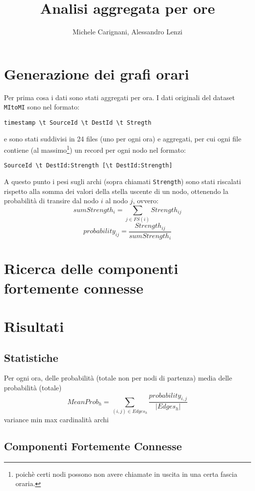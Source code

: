 \documentclass[10pt,a4paper]{article}
\author{Michele Carignani, Alessandro Lenzi}
\title{Analisi aggregata per ore}
\begin{document}
\maketitle

\section{Generazione dei grafi orari}

Per prima cosa i dati sono stati aggregati per ora. I dati originali del dataset \verb!MItoMI! sono nel formato:
\begin{verbatim}
timestamp \t SourceId \t DestId \t Stregth
\end{verbatim}
e sono stati suddivisi in 24 files (uno per ogni ora) e aggregati, per cui
ogni file contiene (al massimo\footnote{poichè certi nodi possono non avere chiamate in uscita
in una certa fascia oraria.}) un record per ogni nodo nel formato:
\begin{verbatim}
SourceId \t DestId:Strength [\t DestId:Strength]
\end{verbatim}

A questo punto i pesi sugli archi (sopra chiamati \verb!Strength!) sono stati riscalati rispetto alla somma
dei valori della stella uscente di un nodo, ottenendo la probabilità di transire dal nodo $i$ al 
nodo $j$, ovvero:
$$ sumStrength_i = \sum_{j \in FS(i)} Strength_{ij} $$
$$ probability_{ij} = \frac{Strength_{ij}}{sumStrength_i} $$

\section{Ricerca delle componenti fortemente connesse}

\section{Risultati}

\subsection{Statistiche}

Per ogni ora, delle probabilità (totale non per nodi di partenza)
 media delle probabilità (totale)
 $$ MeanProb_{h} = \sum_{(i,j) \in Edges_h} \frac{probability_{i,j}}{|Edges_h|} $$
 variance
 min
 max
 cardinalità archi

\subsection{Componenti Fortemente Connesse}
\end{document}
